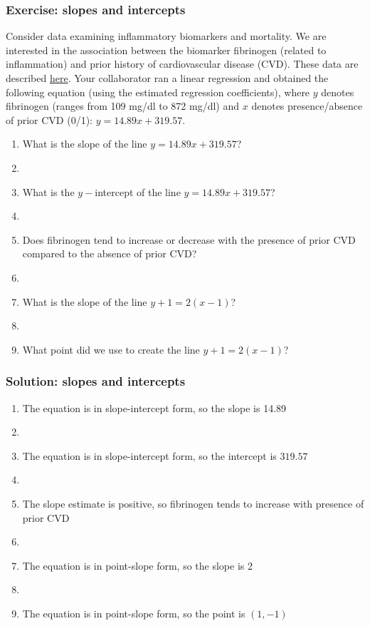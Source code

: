 \documentclass[11pt, hyperref={colorlinks, urlcolor=blue}]{beamer}
\newcommand{\myframe}[1]{\begin{frame} \frametitle{#1}}
\begin{document}
\myframe{Exercise: slopes and intercepts}
Consider data examining inflammatory biomarkers and mortality. We are interested in the association between the biomarker fibrinogen (related to inflammation) and prior history of cardiovascular disease (CVD). These data are described \href{https://www.emersonstatistics.com/datasets/inflamm.doc}{here}. Your collaborator ran a linear regression and obtained the following equation (using the estimated regression coefficients), where $y$ denotes fibrinogen (ranges from 109 mg/dl to 872 mg/dl) and $x$ denotes presence/absence of prior CVD (0/1): $y = 14.89x + 319.57$.
\begin{enumerate}
\item What is the slope of the line $y = 14.89x + 319.57$?
\item[]
\item What is the $y-$intercept of the line $y = 14.89x + 319.57$?
\item[]
\item Does fibrinogen tend to increase or decrease with the presence of prior CVD compared to the absence of prior CVD?
\item[]
\item What is the slope of the line $y + 1 = 2(x - 1)$?
\item[]
\item What point did we use to create the line $y + 1 = 2(x - 1)$?
\end{enumerate}
\end{frame}

\myframe{Solution: slopes and intercepts}
\begin{enumerate}
\item The equation is in slope-intercept form, so the slope is 14.89
\item[]
\item The equation is in slope-intercept form, so the intercept is $319.57$
\item[]
\item The slope estimate is positive, so fibrinogen tends to increase with presence of prior CVD
\item[]
\item The equation is in point-slope form, so the slope is 2
\item[]
\item The equation is in point-slope form, so the point is $(1, -1)$
\end{enumerate}
\end{frame}
\end{document}
